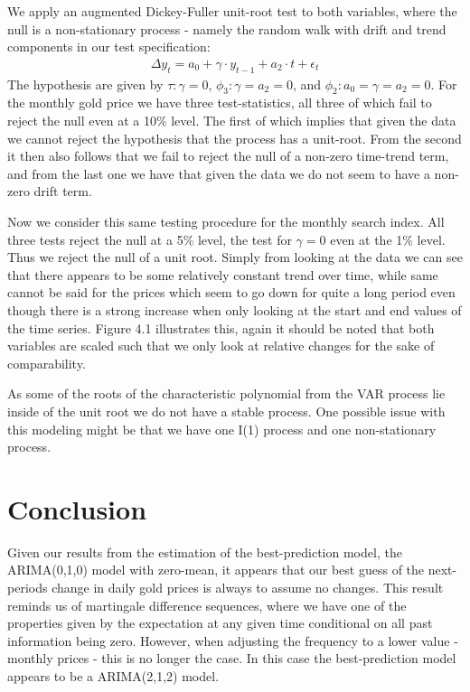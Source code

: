 \documentclass[a4paper]{article}
\theoremstyle{definition}
\begin{document}
We apply an augmented Dickey-Fuller unit-root test to both variables, where the null is a non-stationary process - namely the random walk with drift and trend components in our test specification:
	\begin{align*}
	 \Delta y_t = a_0 + \gamma \cdot y_{t-1} + a_2 \cdot t + \epsilon_{t}
	\end{align*}
The hypothesis are given by $\tau: \gamma = 0$, $\phi_3: \gamma = a_2 = 0$, and $\phi_2: a_0 = \gamma = a_2 = 0$. For the monthly gold price we have three test-statistics, all three of which fail to reject the null even at a 10\% level. The first of which implies that given the data we cannot reject the hypothesis that the process has a unit-root. From the second it then also follows that we fail to reject the null of a non-zero time-trend term, and from the last one we have that given the data we do not seem to have a non-zero drift term.

Now we consider this same testing procedure for the monthly search index. All three tests reject the null at a 5\% level, the test for $\gamma = 0$ even at the 1\% level. Thus we reject the null of a unit root. Simply from looking at the data we can see that there appears to be some relatively constant trend over time, while same cannot be said for the prices which seem to go down for quite a long period even though there is a strong increase when only looking at the start and end values of the time series. Figure 4.1 illustrates this, again it should be noted that both variables are scaled such that we only look at relative changes for the sake of comparability.



As some of the roots of the characteristic polynomial from the VAR process lie inside of the unit root we do not have a stable process. One possible issue with this modeling might be that we have one I(1) process and one non-stationary process. 

\newpage
\section{Conclusion}
Given our results from the estimation of the best-prediction model, the ARIMA(0,1,0) model with zero-mean, it appears that our best guess of the next-periods change in daily gold prices is always to assume no changes. This result reminds us of martingale difference sequences, where we have one of the properties given by the expectation at any given time conditional on all past information being zero. However, when adjusting the frequency to a lower value - monthly prices - this is no longer the case. In this case the best-prediction model appears to be a ARIMA(2,1,2) model. 
%
%
%
%
%
%
%
%
\newpage
{}
\printbibliography
\end{document}
